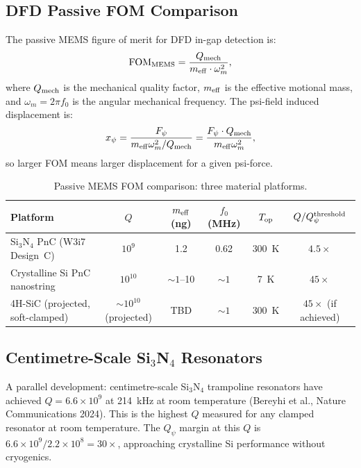 \documentclass[11pt]{article}
\theoremstyle{definition}
\theoremstyle{remark}
\newcommand{\ee}[1]{\times 10^{#1}}
\newcommand{\Qpsi}{Q_\psi}
\newcommand{\FOMMEMS}{\mathrm{FOM}_{\rm MEMS}}
\newcommand{\Qmech}{Q_{\rm mech}}
\begin{document}
\subsection{DFD Passive FOM Comparison}

The passive MEMS figure of merit for DFD in-gap detection is:
\begin{equation}
\FOMMEMS = \frac{\Qmech}{m_{\rm eff} \cdot \omega_m^2},
\label{eq:fom_mems}
\end{equation}
where $\Qmech$ is the mechanical quality factor, $m_{\rm eff}$ is
the effective motional mass, and $\omega_m = 2\pi f_0$ is the angular
mechanical frequency. The psi-field induced displacement is:
\begin{equation}
x_\psi = \frac{F_\psi}{m_{\rm eff} \omega_m^2 / \Qmech}
= \frac{F_\psi \cdot \Qmech}{m_{\rm eff} \omega_m^2},
\label{eq:x_psi}
\end{equation}
so larger FOM means larger displacement for a given psi-force.

\begin{table}[H]
\centering
\caption{Passive MEMS FOM comparison: three material platforms.}
\label{tab:fom_compare}
\renewcommand{\arraystretch}{1.3}
\begin{tabular}{lccccc}
\toprule
\textbf{Platform} & $Q$ & $m_{\rm eff}$ (ng) & $f_0$ (MHz) &
  $T_{\rm op}$ & \textbf{$Q/Q_\psi^{\rm threshold}$} \\
\midrule
Si$_3$N$_4$ PnC (W3i7 Design~C) &
  $10^9$ & 1.2 & 0.62 & 300~K & $4.5\times$ \\
Crystalline Si PnC nanostring &
  $10^{10}$ & $\sim 1$--10 & $\sim 1$ & 7~K & $45\times$ \\
4H-SiC (projected, soft-clamped) &
  $\sim 10^{10}$ (projected) & TBD & $\sim 1$ & 300~K & $45\times$ (if achieved) \\
\bottomrule
\end{tabular}
\end{table}

\subsection{Centimetre-Scale Si$_3$N$_4$ Resonators}

A parallel development: centimetre-scale Si$_3$N$_4$ trampoline
resonators have achieved $Q = 6.6\ee{9}$ at 214~kHz at room
temperature (Bereyhi et al., Nature Communications 2024). This is
the highest $Q$ measured for any clamped resonator at room temperature.
The $\Qpsi$ margin at this $Q$ is $6.6\ee{9}/2.2\ee{8} = 30\times$,
approaching crystalline Si performance without cryogenics.
\end{document}
